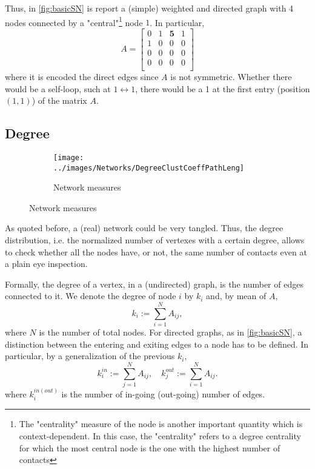 \documentclass[a4paper,10pt,twoside]{book} %
\theoremstyle{definition}
\begin{document}
Thus, in \autoref{fig:basicSN} is report a (simple) weighted and directed graph with 4 nodes connected by a "central"\footnote{The "centrality" measure of the node is another important quantity which is context-dependent. In this case, the "centrality" refers to a degree centrality for which the most central node is the one with the highest number of contacts} node $1$.
In particular,
\[
A = 
\begin{bmatrix}
0 & 1 & \textbf{5} & 1 \\
1 & 0 & 0 & 0 \\
0 & 0 & 0 & 0 \\
0 & 0 & 0 & 0 \\ 
\end{bmatrix}
\]
where it is encoded the direct edges since $A$ is not symmetric. Whether there would be a self-loop, such at $ 1 \longleftrightarrow 1 $, there would be a 1 at the first entry (position $(1,1)$) of the matrix $A$.

\subsection{Degree}

\begin{figure}[ht]
    \begin{subfigure}{\textwidth}
        \texttt{[image: ../images/Networks/DegreeClustCoeffPathLeng]}
        \centering
        \caption{Network measures \cite{Olaf:2011_NonRandomBrain}}
        \label{fig:degree_clustcoefficient_pathlength}
    \end{subfigure}
\end{figure}
As quoted before, a (real) network could be very tangled. Thus, the degree distribution, i.e. the normalized number of vertexes with a certain degree, allows to check whether all the nodes have, or not, the same number of contacts even at a plain eye inspection. 

Formally, the degree of a vertex, in a (undirected) graph, is the number of edges connected to it. We denote the degree of node $i$ by $k_i$ and, by mean of $A$, $$k_i := \sum_{i=1}^{N} A_{ij},$$ where $N$ is the number of total nodes.
For directed graphs, as in \autoref{fig:basicSN}, a distinction between the entering and exiting edges to a node has to be defined. In particular, by a generalization of the previous $k_i$, 
\begin{equation}
	k_i^{in} := \sum_{j=1}^N A_{ij}, \quad k_j^{out} := \sum_{i=1}^N A_{ij}.
	\label{eq:kin_kout}	
\end{equation}
where $k_i^{in(out)}$ is the number of in-going (out-going) number of edges. 
\end{document}
